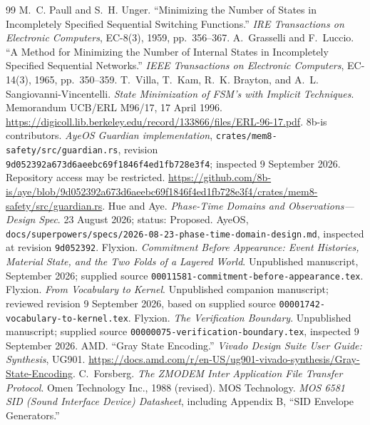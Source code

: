 \documentclass[11pt]{article}
\begin{document}
\begin{thebibliography}{99}
 M.~C. Paull and S.~H. Unger. ``Minimizing the Number of States in Incompletely Specified Sequential Switching Functions.'' \emph{IRE Transactions on Electronic Computers}, EC-8(3), 1959, pp.~356--367.
 A.~Grasselli and F.~Luccio. ``A Method for Minimizing the Number of Internal States in Incompletely Specified Sequential Networks.'' \emph{IEEE Transactions on Electronic Computers}, EC-14(3), 1965, pp.~350--359.
 T.~Villa, T.~Kam, R.~K. Brayton, and A.~L. Sangiovanni-Vincentelli. \emph{State Minimization of FSM's with Implicit Techniques}. Memorandum UCB/ERL M96/17, 17 April 1996. \url{https://digicoll.lib.berkeley.edu/record/133866/files/ERL-96-17.pdf}.
 8b-is contributors. \emph{AyeOS Guardian implementation}, \nolinkurl{crates/mem8-safety/src/guardian.rs}, revision \nolinkurl{9d052392a673d6aeebc69f1846f4ed1fb728e3f4}; inspected 9 September 2026. Repository access may be restricted. \url{https://github.com/8b-is/aye/blob/9d052392a673d6aeebc69f1846f4ed1fb728e3f4/crates/mem8-safety/src/guardian.rs}.
 Hue and Aye. \emph{Phase-Time Domains and Observations---Design Spec}. 23 August 2026; status: Proposed. AyeOS, \nolinkurl{docs/superpowers/specs/2026-08-23-phase-time-domain-design.md}, inspected at revision \texttt{9d052392}.
 Flyxion. \emph{Commitment Before Appearance: Event Histories, Material State, and the Two Folds of a Layered World}. Unpublished manuscript, September 2026; supplied source \nolinkurl{00011581-commitment-before-appearance.tex}.
 Flyxion. \emph{From Vocabulary to Kernel}. Unpublished companion manuscript; reviewed revision 9 September 2026, based on supplied source \nolinkurl{00001742-vocabulary-to-kernel.tex}.
 Flyxion. \emph{The Verification Boundary}. Unpublished manuscript; supplied source \nolinkurl{00000075-verification-boundary.tex}, inspected 9 September 2026.
 AMD. ``Gray State Encoding.'' \emph{Vivado Design Suite User Guide: Synthesis}, UG901. \url{https://docs.amd.com/r/en-US/ug901-vivado-synthesis/Gray-State-Encoding}.
 C.~Forsberg. \emph{The ZMODEM Inter Application File Transfer Protocol}. Omen Technology Inc., 1988 (revised).
 MOS Technology. \emph{MOS 6581 SID (Sound Interface Device) Datasheet}, including Appendix B, ``SID Envelope Generators.''
\end{thebibliography}
\end{document}
